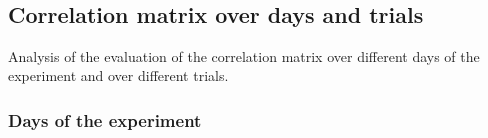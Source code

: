 \documentclass[11pt]{article}
\begin{document}
    \begin{center}
    \end{center}
    { \hspace*{\fill} \\}
    
    \subsection{Correlation matrix over days and
trials}\label{correlation-matrix-over-days-and-trials}

Analysis of the evaluation of the correlation matrix over different days
of the experiment and over different trials.

\subsubsection{Days of the experiment}\label{days-of-the-experiment}
\end{document}
